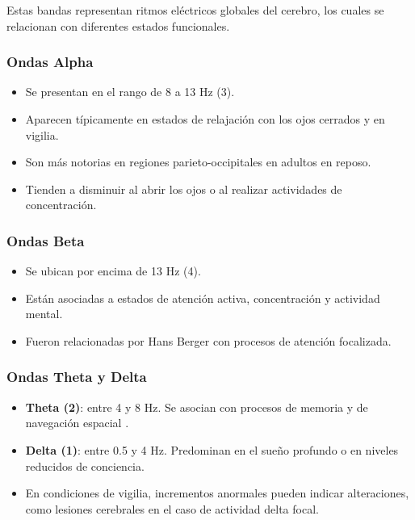 \documentclass[12pt,letterpaper]{article}
\begin{document}
Estas bandas representan ritmos eléctricos globales del cerebro, los cuales se relacionan con diferentes estados funcionales.\cite{nunez_electroencephalography_2017}

\subsubsection{Ondas Alpha}

\begin{itemize}
    \item Se presentan en el rango de 8 a 13 Hz (3).
    \item Aparecen típicamente en estados de relajación con los ojos cerrados y en vigilia.
    \item Son más notorias en regiones parieto-occipitales en adultos en reposo.
    \item Tienden a disminuir al abrir los ojos o al realizar actividades de concentración.
\end{itemize}
\cite{nunez_electroencephalography_2017}
\subsubsection{Ondas Beta}

\begin{itemize}
    \item Se ubican por encima de 13 Hz (4).
    \item Están asociadas a estados de atención activa, concentración y actividad mental.
    \item Fueron relacionadas por Hans Berger con procesos de atención focalizada.
\end{itemize}

\subsubsection{Ondas Theta y Delta}

\begin{itemize}
    \item \textbf{Theta (2)}: entre 4 y 8 Hz. Se asocian con procesos de memoria y de navegación espacial \cite{buzsaki_theta_2005}.
    \item \textbf{Delta (1)}: entre 0.5 y 4 Hz. Predominan en el sueño profundo o en niveles reducidos de conciencia.
    \item En condiciones de vigilia, incrementos anormales pueden indicar alteraciones, como lesiones cerebrales en el caso de actividad delta focal.
\end{itemize}
\cite{kropotov_slow_2009}
\end{document}
